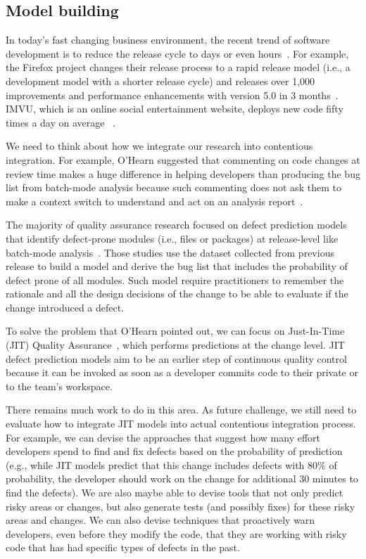 \subsection{Model building}

In today's fast changing business environment, the recent trend of software development is to reduce the release cycle to days or even hours~\cite{RELENG2015}.
For example, the Firefox project changes their release process to a rapid release model (i.e., a development model with a shorter release cycle) and releases over 1,000 improvements and performance enhancements with version 5.0 in 3 months~\cite{Khomh2015EMSE}.
IMVU, which is an online social entertainment website, deploys new code fifty times a day on average ~\cite{AdamsICSE2012}.

We need to think about how we integrate our research into contentious integration.
For example, O'Hearn suggested that commenting on code changes at review time makes a huge difference in helping developers than producing the bug list from batch-mode analysis because such commenting does not ask them to make a context switch to understand and act on an analysis report~\cite{CAV2015}.

The majority of quality assurance research focused on defect prediction models that identify defect-prone modules (i.e., files or packages) at release-level like batch-mode analysis~\cite{Gyimothy2005,hassan2009,Li2006,Munson1992}. Those studies use the dataset collected from previous release to build a model and derive the bug list that includes the probability of defect prone of all modules. Such model require practitioners to remember the rationale and all the design decisions of the change to be able to evaluate if the change introduced a defect.

To solve the problem that O'Hearn pointed out, we can focus on Just-In-Time (JIT) Quality Assurance~\cite{kamei2013tse,Mockus2000BTJ,Kim2008TSE}, which performs predictions at the change level. JIT defect prediction models aim to be an earlier step of continuous quality control because it can be invoked as soon as a developer commits code to their private or to the team’s workspace.

There remains much work to do in this area. As future challenge, we still need to evaluate how to integrate JIT models into actual contentious integration process. For example, we can devise the approaches that suggest how many effort developers spend to find and fix defects based on the probability of prediction (e.g., while JIT models predict that this change includes defects with 80\% of probability, the developer should work on the change for additional 30 minutes to find the defects). 
We are also maybe able to devise tools that not only predict risky areas or changes, but also generate tests (and possibly fixes) for these risky areas and changes. We can also devise techniques that proactively warn developers, even before they modify the code, that they are working with risky code that has had specific types of defects in the past.

